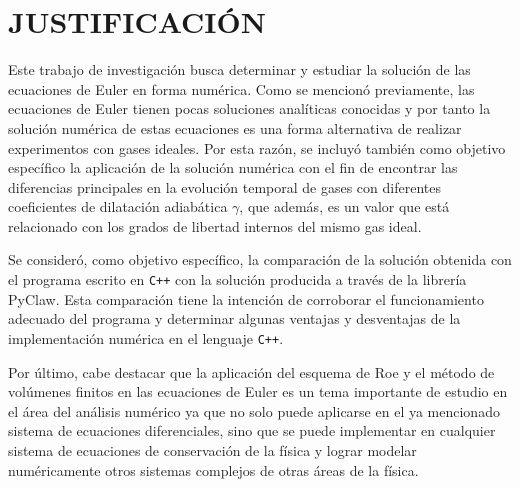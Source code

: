 \chapter{JUSTIFICACIÓN}
Este trabajo de investigación busca determinar y estudiar la solución de las ecuaciones de Euler en forma numérica. Como se mencionó previamente, las ecuaciones de Euler tienen pocas soluciones analíticas conocidas y por tanto la solución numérica de estas ecuaciones es una forma alternativa de realizar experimentos con gases ideales. Por esta razón, se incluyó también como objetivo específico la aplicación de la solución numérica con el fin de encontrar las diferencias principales en la evolución temporal de gases con diferentes coeficientes de dilatación adiabática $\gamma$, que además, es un valor que está relacionado con los grados de libertad internos del mismo gas ideal.

Se consideró, como objetivo específico, la comparación de la solución obtenida con el programa escrito en \texttt{C++} con la solución producida a través de la librería PyClaw. Esta comparación tiene la intención de corroborar el funcionamiento adecuado del programa y determinar algunas ventajas y desventajas de la implementación numérica en el lenguaje \texttt{C++}.

Por último, cabe destacar que la aplicación del esquema de Roe y el método de volúmenes finitos en las ecuaciones de Euler es un tema importante de estudio en el área del análisis numérico ya que no solo puede aplicarse en el ya mencionado sistema de ecuaciones diferenciales, sino que se puede implementar en cualquier sistema de ecuaciones de conservación de la física y lograr modelar numéricamente otros sistemas complejos de otras áreas de la física.
